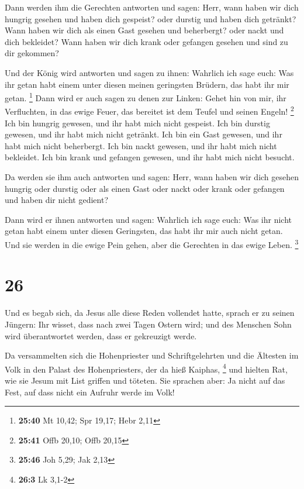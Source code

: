  Dann werden ihm die Gerechten antworten und sagen: Herr,
wann haben wir dich hungrig gesehen und haben dich gespeist? oder
durstig und haben dich getränkt?  Wann haben wir dich als
einen Gast gesehen und beherbergt? oder nackt und dich bekleidet?
 Wann haben wir dich krank oder gefangen gesehen und sind
zu dir gekommen?

 Und der König wird antworten und sagen zu ihnen: Wahrlich
ich sage euch: Was ihr getan habt einem unter diesen meinen geringsten
Brüdern, das habt ihr mir getan. \footnote{\textbf{25:40} Mt 10,42; Spr
  19,17; Hebr 2,11}  Dann wird er auch sagen zu denen zur
Linken: Gehet hin von mir, ihr Verfluchten, in das ewige Feuer, das
bereitet ist dem Teufel und seinen Engeln! \footnote{\textbf{25:41} Offb
  20,10; Offb 20,15}  Ich bin hungrig gewesen, und ihr habt
mich nicht gespeist. Ich bin durstig gewesen, und ihr habt mich nicht
getränkt.  Ich bin ein Gast gewesen, und ihr habt mich
nicht beherbergt. Ich bin nackt gewesen, und ihr habt mich nicht
bekleidet. Ich bin krank und gefangen gewesen, und ihr habt mich nicht
besucht.

 Da werden sie ihm auch antworten und sagen: Herr, wann
haben wir dich gesehen hungrig oder durstig oder als einen Gast oder
nackt oder krank oder gefangen und haben dir nicht gedient?

 Dann wird er ihnen antworten und sagen: Wahrlich ich sage
euch: Was ihr nicht getan habt einem unter diesen Geringsten, das habt
ihr mir auch nicht getan.  Und sie werden in die ewige Pein
gehen, aber die Gerechten in das ewige Leben. \footnote{\textbf{25:46}
  Joh 5,29; Jak 2,13}

\hypertarget{section-13}{%
\section{26}\label{section-13}}

 Und es begab sich, da Jesus alle diese Reden vollendet
hatte, sprach er zu seinen Jüngern:  Ihr wisset, dass nach
zwei Tagen Ostern wird; und des Menschen Sohn wird überantwortet werden,
dass er gekreuzigt werde.

 Da versammelten sich die Hohenpriester und Schriftgelehrten
und die Ältesten im Volk in den Palast des Hohenpriesters, der da hieß
Kaiphas, \footnote{\textbf{26:3} Lk 3,1-2}  und hielten Rat,
wie sie Jesum mit List griffen und töteten.  Sie sprachen
aber: Ja nicht auf das Fest, auf dass nicht ein Aufruhr werde im Volk!

